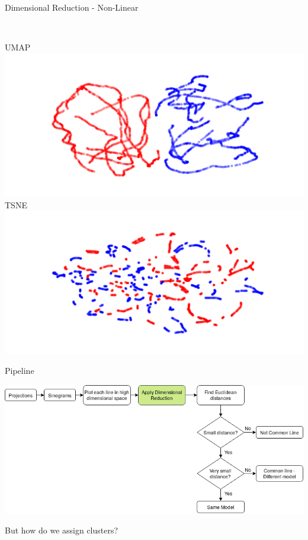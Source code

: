 \documentclass[t, 11pt, xcolor=dvipsnames]{beamer}
\begin{document}
\begin{frame}[fragile]{Dimensional Reduction - Non-Linear}
{\begin{center}
\begin{minipage}{0.45\textwidth}
		  \end{minipage}
			~
		  \begin{minipage}{0.45\textwidth}
	          UMAP\\
                  \includegraphics[width=1\textwidth]{images/dimredcomps/UMAP_gt.png}\\
		  TSNE\\
                  \includegraphics[width=1\textwidth]{images/dimredcomps/TSNE_gt.png}\\
		  \end{minipage}
	\end{center}}
\end{frame}

\begin{frame}[fragile]{Pipeline}
  \begin{center}\includegraphics[width=1\textwidth]{images/second_pipeline.png}
    \end{center}

    \pause
    But how do we assign clusters?
\end{frame}
\end{document}
